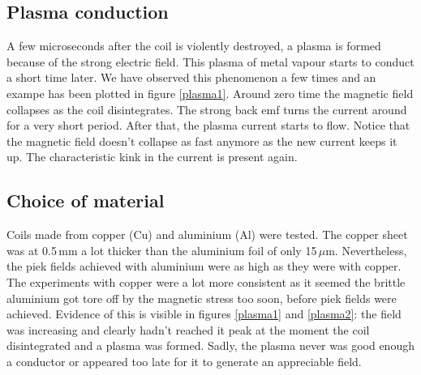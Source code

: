 \subsection{Plasma conduction}

A few microseconds after the coil is violently destroyed, a plasma is formed 
because of the strong electric field. This plasma of metal vapour starts to 
conduct a short time later. We have observed this phenomenon a few times and an 
exampe has been plotted in figure \ref{plasma1}. Around zero time the magnetic 
field collapses as the coil disintegrates. The strong back emf turns the 
current around for a very short period. After that, the plasma current starts 
to flow. Notice that the magnetic field doesn't collapse as fast anymore as the 
new current keeps it up. The characteristic kink in the current is present 
again.




\subsection{Choice of material}

Coils made from copper (Cu) and aluminium (Al) were tested. The copper sheet 
was at 0.5\,mm a lot thicker than the aluminium foil of only 15\,$\mu$m.  
Nevertheless, the piek fields achieved with aluminium were as high as they were 
with copper. The experiments with copper were a lot more consistent as it 
seemed the brittle aluminium got tore off by the magnetic stress too soon, 
before piek fields were achieved. Evidence of this is visible in figures 
\ref{plasma1} and \ref{plasma2}: the field was increasing and clearly hadn't 
reached it peak at the moment the coil disintegrated and a plasma was formed.  
Sadly, the plasma never was good enough a conductor or appeared too late for it 
to generate an appreciable field.

